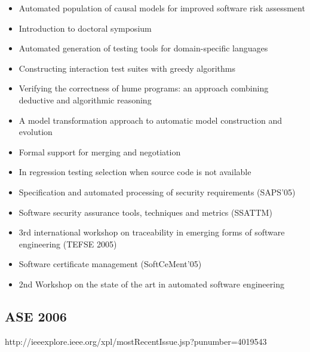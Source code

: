 {\begin{itemize}[itemsep=-1ex]
  \item Automated population of causal models for improved software risk assessment
  \item Introduction to doctoral symposium
  \item Automated generation of testing tools for domain-specific languages
  \item Constructing interaction test suites with greedy algorithms
  \item Verifying the correctness of hume programs: an approach combining deductive and algorithmic reasoning
  \item A model transformation approach to automatic model construction and evolution
  \item Formal support for merging and negotiation
  \item In regression testing selection when source code is not available
  \item Specification and automated processing of security requirements (SAPS'05)
  \item Software security assurance tools, techniques and metrics (SSATTM)
  \item 3rd international workshop on traceability in emerging forms of software engineering (TEFSE 2005)
  \item Software certificate management (SoftCeMent'05)
  \item 2nd Workshop on the state of the art in automated software engineering
\end{itemize}
}

\subsection{ASE 2006}

http://ieeexplore.ieee.org/xpl/mostRecentIssue.jsp?punumber=4019543

